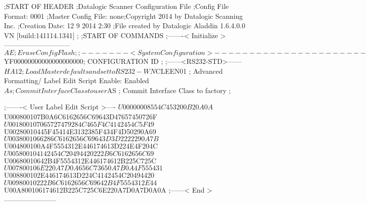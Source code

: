 ;START OF HEADER
;Datalogic Scanner Configuration File
;Config File Format: 0001
;Master Config File: none;Copyright 2014 by Datalogic Scanning Inc.
;Creation Date: 12 9 2014 2:30
;File created by Datalogic Aladdin 1.6.4.0.0 VN [build:141114.1341]
;
;START OF COMMANDS
;-------< Initialize >-----------------------------
$AE                 ; Erase Config Flash
;
;-------< System Configuration >-------------------------------
$YF00000000000000000000; CONFIGURATION ID
;
;------<RS232-STD>------
$HA12               ; Load Master defaults and set to RS232-WN
$CLEEN01            ; Advanced Formatting/ Label Edit Script Enable: Enabled
$As                 ; Commit Interface Class to user
$AS                 ; Commit Interface Class to factory
;

;-------< User Label Edit Script >----
$U00000008554C453200B20A0A
$U000800107B0A6C6162656C69643D47657450726F
$U001800107065727479284C465F4C4142454C5F49
$U00280010445F45414E3132385F434F4D50290A69
$U0038001066286C6162656C69643D3D2222290A7B
$U004800100A4F5554312E446174613D224E4F204C
$U005800104142454C20494420222B6C6162656C69
$U00680010642B4F5554312E446174612B225C725C
$U007800106E220A7D0A656C73650A7B0A4F555431
$U008800102E446174613D224C4142454C20494420
$U00980010222B6C6162656C69642B4F5554312E44
$U00A800106174612B225C725C6E220A7D0A7D0A0A
;------< End >-----------------------
